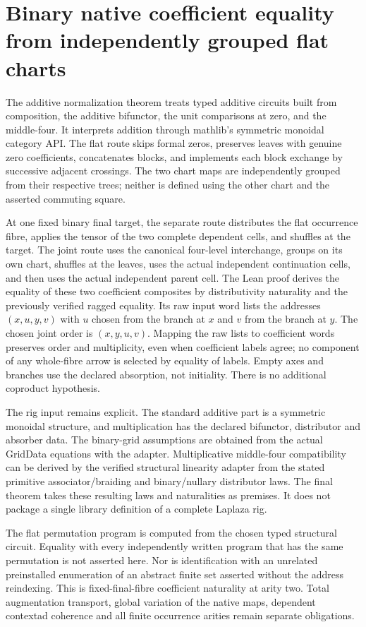 \documentclass{article}
\begin{document}
\section*{Binary native coefficient equality from independently grouped flat charts}
The additive normalization theorem treats typed additive circuits built
from composition, the additive bifunctor, the unit comparisons at zero,
and the middle-four. It interprets addition through mathlib's symmetric
monoidal category API. The flat route skips formal zeros, preserves
leaves with genuine zero coefficients, concatenates blocks, and implements
each block exchange by successive adjacent crossings. The two chart maps
are independently grouped from their respective trees; neither is defined
using the other chart and the asserted commuting square.

At one fixed binary final target, the separate route distributes the
flat occurrence fibre, applies the tensor of the two complete dependent
cells, and shuffles at the target. The joint route uses the canonical
four-level interchange, groups on its own chart, shuffles at the leaves,
uses the actual independent continuation cells, and then uses the actual
independent parent cell. The Lean proof derives the equality of these
two coefficient composites by distributivity naturality and the previously
verified ragged equality. Its raw input word lists the addresses
$(x,u,y,v)$ with $u$ chosen from the branch at $x$ and $v$ from the branch
at $y$. The chosen joint order is $(x,y,u,v)$. Mapping the raw lists to
coefficient words preserves order and multiplicity, even when coefficient
labels agree; no component of any whole-fibre arrow is selected by equality
of labels. Empty axes and branches use the declared absorption, not
initiality. There is no additional coproduct hypothesis.

The rig input remains explicit. The standard additive part is a symmetric
monoidal structure, and multiplication has the declared bifunctor,
distributor and absorber data. The binary-grid assumptions are obtained
from the actual GridData equations with the adapter. Multiplicative
middle-four compatibility can be derived by the verified structural
linearity adapter from the stated primitive associator/braiding and
binary/nullary distributor laws. The final theorem takes these
resulting laws and naturalities as premises. It does not package
a single library definition of a complete Laplaza rig.

The flat permutation program is computed from the chosen typed structural
circuit. Equality with every independently written program that has the
same permutation is not asserted here. Nor is identification with an
unrelated preinstalled enumeration of an abstract finite set asserted
without the address reindexing. This is fixed-final-fibre coefficient
naturality at arity two. Total augmentation transport, global variation of
the native maps, dependent contextad coherence and all finite occurrence
arities remain separate obligations.
\end{document}
